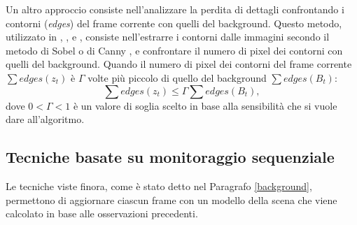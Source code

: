 Un altro approccio consiste nell'analizzare la perdita di dettagli confrontando i contorni (\textit{edges}) del frame corrente con quelli del background.
Questo metodo, utilizzato in \cite{harasse2004automated}, \cite{gil2007automatic}, \cite{ellwart2012camera} e \cite{kryjak2012fpga}, consiste nell'estrarre i contorni dalle immagini secondo il metodo di Sobel \cite{sobel19683x3} o di Canny \cite{canny1986computational}, e confrontare il numero di pixel dei contorni con quelli del background. 
Quando il numero di pixel dei contorni del frame corrente $\sum edges(z_t)$ \`e $\Gamma$ volte pi\`u piccolo di quello del background $\sum edges(B_t)$:
\[ \sum edges(z_t) \leq \Gamma \sum edges(B_t), \]
dove $0<\Gamma<1$ \`e  un valore di soglia scelto in base alla sensibilit\`a che si vuole dare all'algoritmo.
\subsection{Tecniche basate su monitoraggio sequenziale}
Le tecniche viste finora, come \`e stato detto nel Paragrafo \ref{background}, permettono di aggiornare ciascun frame con un modello della scena che viene calcolato in base alle osservazioni precedenti.
